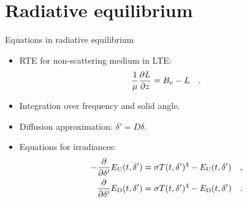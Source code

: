 \documentclass[aspectratio=43]{beamer}
\begin{document}
\section{Radiative equilibrium}
\begin{frame}{Equations in radiative equilibrium}
  \begin{itemize}
    \item<1-> RTE for non-scattering medium in LTE:
      \begin{equation}
        \label{eq:RTE_analytical}
        \frac{1}{\mu} \pdv{L}{z} = B_\nu - L
        \quad .
      \end{equation}
    \item<2-> Integration over frequency and solid angle.
    \item<2-> Diffusion approximation: $\delta' = D \delta$.
    \item<3-> Equations for irradiances:
      \begin{align}
        \label{eq:irradiance_upward}
        - \pdv*{E_\text{U}(t, \delta')}{\delta'} & = \sigma T(t, \delta')^4 - E_\text{U}(t, \delta') \quad , \\
        \label{eq:irradiance_downward}
        \pdv*{E_\text{D}(t, \delta')}{\delta'} & = \sigma T(t, \delta')^4 - E_\text{D}(t, \delta')
        \quad .
      \end{align}
  \end{itemize}
\end{frame}
\end{document}
